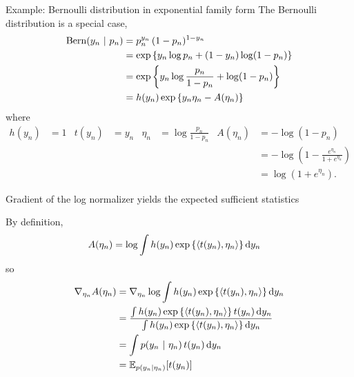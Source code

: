 \documentclass[aspectratio=169]{beamer}
\begin{document}
\begin{frame}{Example: Bernoulli distribution in exponential family form}
    The Bernoulli distribution is a special case, 
    \begin{align}
        \mathrm{Bern}(y_n ~\vert~ p_n) &= p_n^{y_n} \, (1-p_n)^{1 - y_n} \\
        &= \exp \left\{ y_n \log p_n + (1-y_n) \log (1- p_n) \right \} \\
        &= \exp \left\{ y_n \log \frac{p_n}{1 - p_n} + \log (1 - p_n) \right \}  \\
        &= h(y_n) \exp \left\{ y_n \eta_n - A(\eta_n) \right \} 
    \end{align}
    where
    \begin{align}
        h(y_n) &= 1 & 
        t(y_n) &= y_n & 
        \eta_n &= \log \frac{p_n}{1- p_n} &
        A(\eta_n) &= -\log ( 1 - p_n) \\
        & & & & & & &= - \log \left(1 - \frac{e^{\eta_n}}{1 + e^{\eta_n}} \right) \\
        & & & & & & &= \log \left(1 + e^{\eta_n} \right).
    \end{align}
\end{frame}

\begin{frame}{Gradient of the log normalizer yields the expected sufficient statistics}
    
    By definition,
    \begin{align}
        A(\eta_n) &= \log \int h(y_n) \exp \left \{\langle t(y_n), \eta_n \rangle \right\} \mathop{}\!\mathrm{d} y_n
    \end{align}
    so
    \begin{align}
        \nabla_{\eta_n} A(\eta_n) 
        &= \nabla_{\eta_n} \log \int h(y_n) \exp \left \{\langle t(y_n), \eta_n \rangle \right\} \mathop{}\!\mathrm{d} y_n \\
        &= \frac{\int h(y_n) \exp \left \{\langle t(y_n), \eta_n \rangle \right\} t(y_n) \mathop{}\!\mathrm{d} y_n}{\int h(y_n) \exp \left \{\langle t(y_n), \eta_n \rangle \right\} \mathop{}\!\mathrm{d} y_n} \\
        &= \int p(y_n ~\vert~ \eta_n) \, t(y_n) \mathop{}\!\mathrm{d} y_n \\
        &= \mathbb{E}_{p(y_n | \eta_n)}[t(y_n)]
    \end{align}
    
\end{frame}
\end{document}

